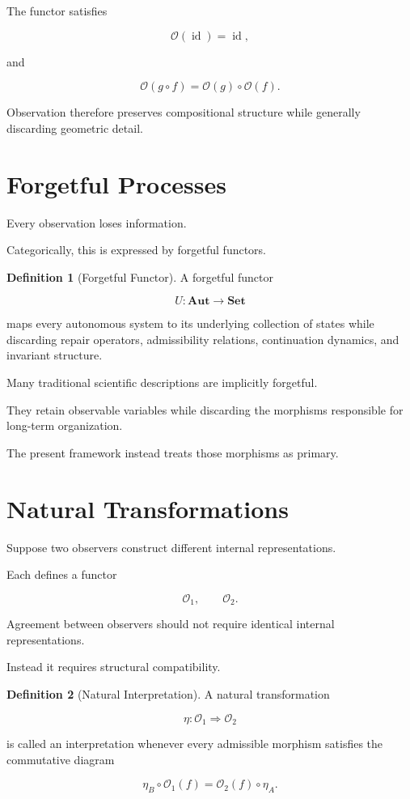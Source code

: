 \documentclass[11pt,oneside]{book}
\numberwithin{equation}{chapter}
\theoremstyle{definition}
\newtheorem{definition}{Definition}[chapter]
\theoremstyle{plain}
\begin{document}
The functor satisfies

\[
\mathcal{O}
(\operatorname{id})
=
\operatorname{id},
\]

and

\[
\mathcal{O}(g\circ f)
=
\mathcal{O}(g)
\circ
\mathcal{O}(f).
\]

Observation therefore preserves compositional structure while generally
discarding geometric detail.

\section{Forgetful Processes}

Every observation loses information.

Categorically, this is expressed by forgetful functors.

\begin{definition}[Forgetful Functor]

A forgetful functor

\[
U
:
\mathbf{Aut}
\rightarrow
\mathbf{Set}
\]

maps every autonomous system to its underlying collection of states while
discarding repair operators, admissibility relations, continuation dynamics,
and invariant structure.

\end{definition}

Many traditional scientific descriptions are implicitly forgetful.

They retain observable variables while discarding the morphisms responsible
for long-term organization.

The present framework instead treats those morphisms as primary.

\section{Natural Transformations}

Suppose two observers construct different internal representations.

Each defines a functor

\[
\mathcal{O}_1,
\qquad
\mathcal{O}_2.
\]

Agreement between observers should not require identical internal
representations.

Instead it requires structural compatibility.

\begin{definition}[Natural Interpretation]

A natural transformation

\[
\eta:
\mathcal{O}_1
\Rightarrow
\mathcal{O}_2
\]

is called an interpretation whenever every admissible morphism satisfies the
commutative diagram

\[
\eta_B
\circ
\mathcal{O}_1(f)
=
\mathcal{O}_2(f)
\circ
\eta_A.
\]

\end{definition}
\end{document}
